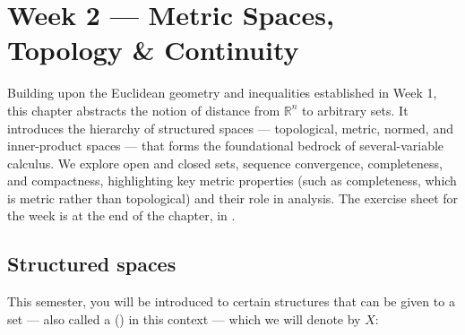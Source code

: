 \chapter{Week 2 --- Metric Spaces, Topology \& Continuity}

Building upon the Euclidean geometry and inequalities established in Week 1, this chapter abstracts the notion of distance from $\mathbb{R}^n$ to arbitrary sets. It introduces the hierarchy of structured spaces --- topological, metric, normed, and inner-product spaces --- that forms the foundational bedrock of several-variable calculus. We explore open and closed sets, sequence convergence, completeness, and compactness, highlighting key metric properties (such as completeness, which is metric rather than topological) and their role in analysis. The exercise sheet for the week is at the end of the chapter, in .


\section{Structured spaces}
\label{sec:structured_spaces}

This semester, you will be introduced to certain structures that can be given to a set --- also
called a  () in this context --- which we will denote by $X$:

